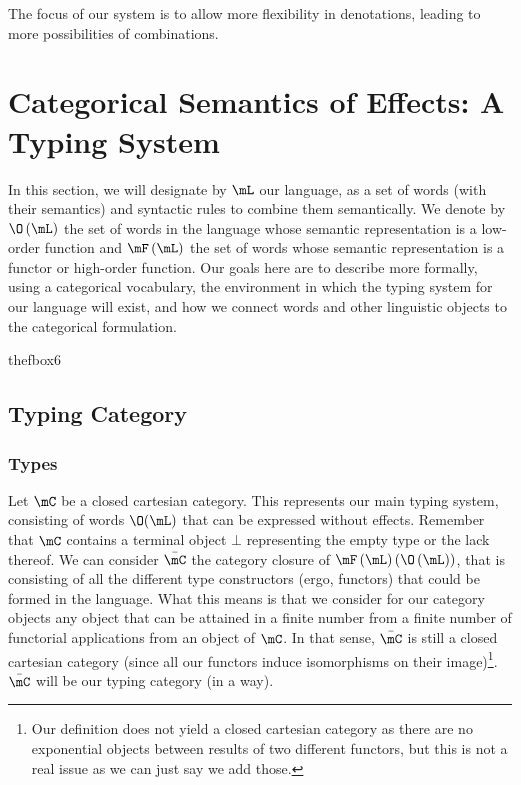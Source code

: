 \documentclass[math, english, info]{cours}
\begin{document}
The focus of our system is to allow more flexibility in denotations, leading to more
possibilities of combinations.

\section{Categorical Semantics of Effects: A Typing System}
\label{sec:typingsystem}
In this section, we will designate by $\mL$ our language, as a set of words (with their semantics) and syntactic rules to combine them semantically.
We denote by $\O\left( \mL \right)$ the set of words in the language whose semantic representation is a low-order function and $\mF\left( \mL \right)$ the set of words whose semantic representation is a functor or high-order function.
Our goals here are to describe more formally, using a categorical vocabulary, the environment in which the typing system for our language will exist, and how we connect words and other linguistic objects to the categorical formulation.

\csname thefbox6

\subsection{Typing Category}\label{subsec:typingcategory}
\subsubsection{Types}\label{subsubsec:types}
Let $\mC$ be a closed cartesian category. This represents our main typing system, consisting of words $\O(\mL)$ that can be expressed without effects.
Remember that $\mC$ contains a terminal object $\bot$ representing the empty type or the lack thereof.
We can consider $\bar{\mC}$ the category closure of $\mF\left( \mL \right)\left(\O\left( \mL \right)\right)$, that is consisting of all the different type constructors (ergo, functors) that could be formed in the language.
What this means is that we consider for our category objects any object that can be attained in a finite number from a finite number of functorial applications from an object of $\mC$.
In that sense, $\bar{\mC}$ is still a closed cartesian category (since all our functors induce isomorphisms on their image)\footnote{Our definition does not yield a closed cartesian category as there are no exponential objects between results of two different functors, but this is not a real issue as we can just say we add those.}.
$\bar{\mC}$ will be our typing category (in a way).
\end{document}

